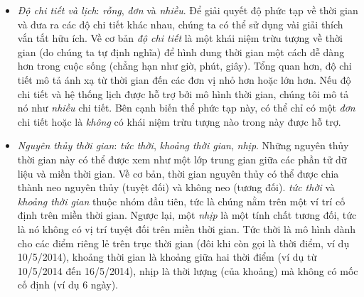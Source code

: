 \begin{itemize}
    \item \textit{Độ chi tiết và lịch}: \textit{rỗng}, \textit{đơn} và \textit{nhiều}. Để giải quyết độ phức tạp về thời gian và đưa ra các độ chi tiết khác nhau, chúng ta có thể sử dụng vài giải thích vắn tắt hữu ích. Về cơ bản \textit{độ chi tiết} là một khái niệm trừu tượng về thời gian (do chúng ta tự định nghĩa) để hình dung thời gian một cách dễ dàng hơn trong cuộc sống (chẳng hạn như giờ, phút, giây). Tổng quan hơn, độ chi tiết mô tả ánh xạ từ thời gian đến các đơn vị nhỏ hơn hoặc lớn hơn. Nếu độ chi tiết và hệ thống lịch được hỗ trợ bởi mô hình thời gian, chúng tôi mô tả nó như \textit{nhiều} chi tiết. Bên cạnh biến thể phức tạp này, có thể chỉ có một \textit{đơn} chi tiết hoặc là \textit{không} có khái niệm trừu tượng nào trong này được hỗ trợ.
    \item \textit{Nguyên thủy thời gian}: \textit{tức thời}, \textit{khoảng thời gian}, \textit{nhịp}. Những nguyên thủy thời gian này có thể được xem như một lớp trung gian giữa các phần tử dữ liệu và miền thời gian. Về cơ bản, thời gian nguyên thủy có thể được chia thành neo nguyên thủy (tuyệt đối) và không neo (tương đối). \textit{tức thời} và \textit{khoảng thời gian} thuộc nhóm đầu tiên, tức là chúng nằm trên một ví trí cố định trên miền thời gian. Ngược lại, một \textit{nhịp} là một tính chất tương đối, tức là nó không có vị trí tuyệt đối trên miền thời gian. Tức thời là mô hình dành cho các điểm riêng lẻ trên trục thời gian (đôi khi còn gọi là thời điểm, ví dụ 10/5/2014), khoảng thời gian là khoảng giữa hai thời điểm (ví dụ từ 10/5/2014 đến 16/5/2014), nhịp là thời lượng (của khoảng) mà không có mốc cố định (ví dụ 6 ngày).

\end{itemize}
